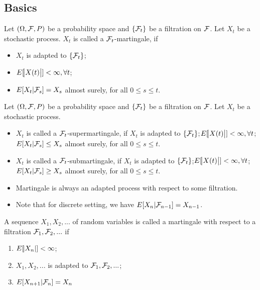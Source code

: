 \begin{refsection}
\subsection{Basics}
\begin{definition}[martingale]
Let $(\Omega,\mathcal{F},P)$ be a probability space and $\{\mathcal{F}_t\}$ be a filtration on $\mathcal{F}$.	Let $X_t$ be a stochastic process. $X_t$ is called a  $\mathcal{F}_t$-martingale, if 
\begin{itemize}
	\item $X_t$ is adapted to $\{\mathcal{F}_t\}$;
	\item $E[\abs{X(t)}] < \infty,\forall t$; 
	\item $E[X_t|\mathcal{F}_s] = X_s$ almost surely, for all $0\leq s \leq t$.
\end{itemize}
\end{definition}

\begin{definition}
	Let $(\Omega,\mathcal{F},P)$ be a probability space and $\{\mathcal{F}_t\}$ be a filtration on $\mathcal{F}$.	Let $X_t$ be a stochastic process. 
\begin{itemize}
	\item $X_t$ is called a  $\mathcal{F}_t$-supermartingale, if $X_t$ is adapted to $\{\mathcal{F}_t\}$;$E[\abs{X(t)}] < \infty,\forall t$;  $E[X_t|\mathcal{F}_s] \leq X_s$ almost surely, for all $0\leq s \leq t$.
	\item $X_t$ is called a  $\mathcal{F}_t$-submartingale, if $X_t$ is adapted to $\{\mathcal{F}_t\}$;$E[\abs{X(t)}] < \infty,\forall t$;  $E[X_t|\mathcal{F}_s] \geq X_s$ almost surely, for all $0\leq s \leq t$.
\end{itemize}	
\end{definition}


\begin{remark}\hfill
\begin{itemize}
    \item Martingale is always an adapted process with respect to some filtration.
    \item Note that for discrete setting, we have $E[X_n|\mathcal{F}_{n-1}] = X_{n-1}$. 
\end{itemize}
\end{remark}

\begin{definition}\cite[49]{brzezniak1999basic}
A sequence $X_1,X_2,...$ of random variables is called a martingale with respect to a filtration $\mathcal{F}_1,\mathcal{F}_2,...$ if 
\begin{enumerate}
\item $E[\abs{X_n}] < \infty$;
\item $X_1,X_2,...$ is adapted to $\mathcal{F}_1,\mathcal{F}_2,...$; 
\item $E[X_{n+1}|\mathcal{F}_n] = X_n$
\end{enumerate}
\end{definition}


\end{refsection}
